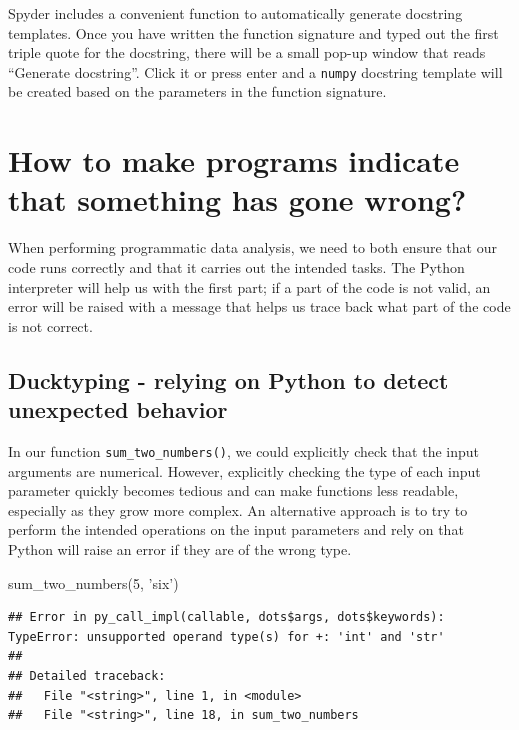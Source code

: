 \documentclass[]{Nemilov}
\newenvironment{Shaded}{\begin{snugshade}}{\end{snugshade}}
\newcommand{\DecValTok}[1]{\textcolor[rgb]{0.00,0.00,0.81}{#1}}
\newcommand{\NormalTok}[1]{#1}
\newcommand{\StringTok}[1]{\textcolor[rgb]{0.31,0.60,0.02}{#1}}
\begin{document}
Spyder includes a convenient function to automatically generate docstring
templates. Once you have written the function signature and typed out the first
triple quote for the docstring, there will be a small pop-up window that reads
``Generate docstring''. Click it or press enter and a \texttt{numpy} docstring template
will be created based on the parameters in the function signature.

\hypertarget{py-dev-how-to-make-programs-indicate-that-something-has-gone-wrong}{%
\section{How to make programs indicate that something has gone wrong?}\label{py-dev-how-to-make-programs-indicate-that-something-has-gone-wrong}}

When performing programmatic data analysis, we need to both ensure that our
code runs correctly and that it carries out the intended tasks. The Python
interpreter will help us with the first part; if a part of the code is not
valid, an error will be raised with a message that helps us trace back what
part of the code is not correct.

\hypertarget{py-dev-ducktyping-relying-on-Python-to-detect-unexpected-behavior}{%
\subsection{Ducktyping - relying on Python to detect unexpected behavior}\label{py-dev-ducktyping-relying-on-Python-to-detect-unexpected-behavior}}

In our function \texttt{sum\_two\_numbers()}, we could explicitly check that the input
arguments are numerical. However, explicitly checking the type of each input
parameter quickly becomes tedious and can make functions less readable,
especially as they grow more complex. An alternative approach is to try to
perform the intended operations on the input parameters and rely on that Python
will raise an error if they are of the wrong type.

\begin{Shaded}
\begin{Highlighting}[]
\NormalTok{sum_two_numbers(}\DecValTok{5}\NormalTok{, }\StringTok{'six'}\NormalTok{)}
\end{Highlighting}
\end{Shaded}

\begin{verbatim}
## Error in py_call_impl(callable, dots$args, dots$keywords): TypeError: unsupported operand type(s) for +: 'int' and 'str'
## 
## Detailed traceback: 
##   File "<string>", line 1, in <module>
##   File "<string>", line 18, in sum_two_numbers
\end{verbatim}
\end{document}
